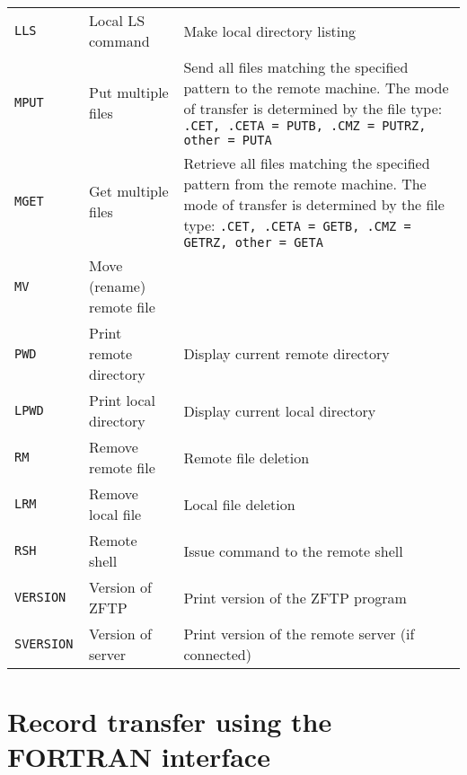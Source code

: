 \begin{longtable}{|>{\tt}p{}|p{}|p{}|}
\tt LLS          & Local  LS command           &
   Make local  directory listing                                              \\
\tt MPUT         & Put multiple files          &
    Send all files matching the specified pattern to the remote machine.
    The mode of transfer is determined by the file type:
    {\tt.CET, .CETA = PUTB, .CMZ = PUTRZ, other = PUTA}                     \\
\tt MGET         & Get multiple files          &
    Retrieve all files matching the specified pattern from the remote machine.
    The mode of transfer is determined by the file type:
    {\tt.CET, .CETA = GETB, .CMZ = GETRZ, other = GETA}                     \\
\tt MV           & Move (rename) remote file   &                            \\
\tt PWD          & Print remote directory      &
    Display current remote directory                                          \\
\tt LPWD         & Print local  directory      &
    Display current local  directory                                          \\
\tt RM           & Remove remote file          &
    Remote file deletion                                                      \\
\tt LRM          & Remove local  file          &
    Local  file deletion                                                      \\
\tt RSH          & Remote shell                &
    Issue command to the remote shell                                         \\
\tt VERSION      & Version of ZFTP             &
    Print version of the ZFTP program                                         \\
\tt SVERSION     & Version of server           &
Print version of the remote server (if connected)                             \\
\hline
\end{longtable}
\clearpage

\section{Record transfer using the FORTRAN interface}

